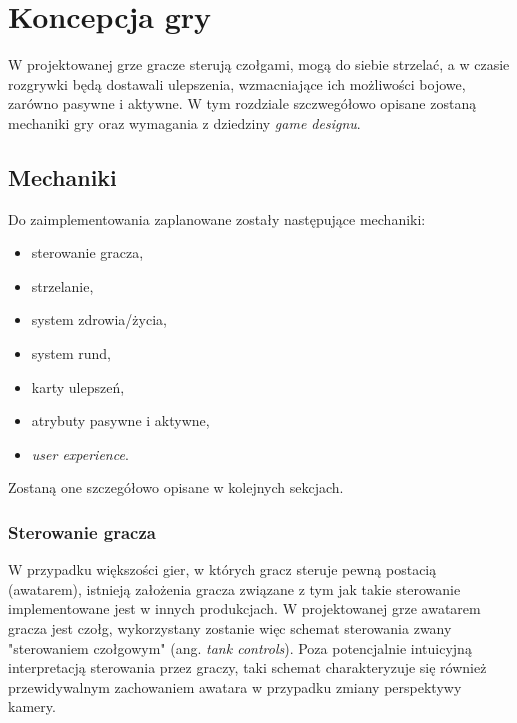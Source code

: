 \chapter{Koncepcja gry}\label{ch:concept}
W projektowanej grze gracze sterują czołgami, mogą do siebie strzelać, a w czasie rozgrywki będą dostawali ulepszenia, wzmacniające ich możliwości bojowe, zarówno pasywne i aktywne.
W tym rozdziale szczwegółowo opisane zostaną mechaniki gry oraz wymagania z dziedziny \emph{game designu}.

\section{Mechaniki}\label{sec:mechanics_concept}

Do zaimplementowania zaplanowane zostały następujące mechaniki:

\begin{itemize}
    \item sterowanie gracza,
    \item strzelanie,
    \item system zdrowia/życia,
    \item system rund,
    \item karty ulepszeń,
    \item atrybuty pasywne i aktywne,
    \item \emph{user experience}.
\end{itemize}

Zostaną one szczegółowo opisane w kolejnych sekcjach.



\subsection{Sterowanie gracza}\label{sec:steering_concept}

W przypadku większości gier, w których gracz steruje pewną postacią (awatarem), istnieją założenia gracza związane z tym jak takie sterowanie implementowane jest w innych produkcjach.
W projektowanej grze awatarem gracza jest czołg, wykorzystany zostanie więc schemat sterowania zwany "sterowaniem czołgowym" (ang. \emph{tank controls}). \cite{horror_tank_controls}
Poza potencjalnie intuicyjną interpretacją sterowania przez graczy, taki schemat charakteryzuje się również przewidywalnym zachowaniem awatara w przypadku zmiany perspektywy kamery.

